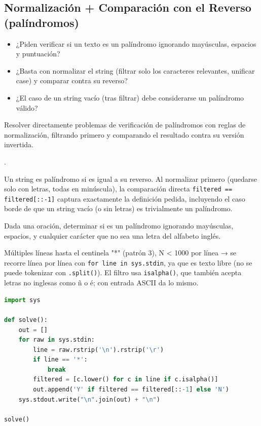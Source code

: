 \subsection{Normalización + Comparación con el Reverso (palíndromos)}
\label{alg:9-2}


\begin{itemize}
\item ¿Piden verificar si un texto es un palíndromo ignorando mayúsculas, espacios y puntuación?
\item ¿Basta con normalizar el string (filtrar solo los caracteres relevantes, unificar case) y comparar contra su reverso?
\item ¿El caso de un string vacío (tras filtrar) debe considerarse un palíndromo válido?
\end{itemize}

 Resolver directamente problemas de verificación de palíndromos con reglas de normalización, filtrando primero y comparando el resultado contra su versión invertida.

 .

 Un string es palíndromo si es igual a su reverso. Al normalizar primero (quedarse solo con letras, todas en minúscula), la comparación directa \texttt{filtered == filtered[::-1]} captura exactamente la definición pedida, incluyendo el caso borde de que un string vacío (o sin letras) es trivialmente un palíndromo.


Dada una oración, determinar si es un palíndromo ignorando mayúsculas, espacios, y cualquier carácter que no sea una letra del alfabeto inglés.

 Múltiples líneas hasta el centinela "*" (patrón 3), N < 1000 por línea → se recorre línea por línea con \texttt{for line in sys.stdin}, ya que es texto libre (no se puede tokenizar con \texttt{.split()}). El filtro usa \texttt{isalpha()}, que también acepta letras no inglesas como ñ o é; con entrada ASCII da lo mismo.


\begin{lstlisting}[language=Python]
import sys

def solve():
    out = []
    for raw in sys.stdin:
        line = raw.rstrip('\n').rstrip('\r')
        if line == '*':
            break
        filtered = [c.lower() for c in line if c.isalpha()]
        out.append('Y' if filtered == filtered[::-1] else 'N')
    sys.stdout.write("\n".join(out) + "\n")

solve()
\end{lstlisting}
